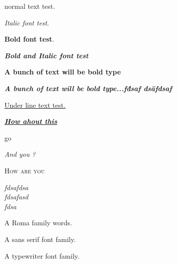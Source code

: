 \documentclass[UTF8]{ctexart}
\begin{document}
	
	normal text test.
	
	\textit{Italic font test}.
	
	\textbf{Bold font test}.
	
	\textbf{\textit{Bold and Italic font test}}
	
\bfseries A bunch of text will be bold type

{\itshape		\bfseries A bunch of text will be bold type...f\'dsaf ds\"afdsaf}

\underline{Under line text test.}

\begin{center}
	\underline{\textit{\textbf{How ahout this }}}
\end{center}

\textup{go}

\slshape{And you ?}

\scshape{How are you }


\itshape
fdsafdsa\\
fdsafasd\\
fdsa

\upshape
\rmfamily
A Roma family words.

\sffamily
A sans serif font family.

\ttfamily
A typewriter font family.
\end{document}
